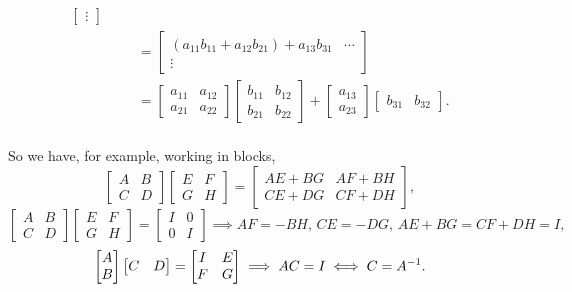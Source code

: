 \documentclass[MathsNotesBase.tex]{subfiles}
\begin{document}
{\begin{align*}
\begin{bmatrix}
			\vdots
			\end{bmatrix} \\
		&&  &= 
			\begin{bmatrix}
			(a_{11}b_{11} + a_{12}b_{21}) + a_{13}b_{31} & \cdots\\
			\vdots
			\end{bmatrix} \\
		&&  &= 
			\begin{bmatrix}
			a_{11} & a_{12}\\
			a_{21} & a_{22}
			\end{bmatrix} 
			\begin{bmatrix}
			b_{11} & b_{12}\\
			b_{21} & b_{22}
			\end{bmatrix} + 
			\begin{bmatrix}
			a_{13}\\a_{23}
			\end{bmatrix}
			\begin{bmatrix}
			b_{31} & b_{32}
			\end{bmatrix}.\\
		\end{align*}
		
		So we have, for example, working in blocks,
		\[
			\begin{bmatrix}
			A & B\\
			C & D
			\end{bmatrix}
			\begin{bmatrix}
			E & F\\
			G & H
			\end{bmatrix} = 
			\begin{bmatrix}
			AE + BG & AF + BH\\
			CE + DG & CF + DH
			\end{bmatrix},
		\]
		\[
			\begin{bmatrix}
			A & B\\
			C & D
			\end{bmatrix}
			\begin{bmatrix}
			E & F\\
			G & H
			\end{bmatrix} = 
			\begin{bmatrix}
			I & 0\\
			0 & I
			\end{bmatrix} \implies
			AF = -BH,\, CE = -DG,\, AE + BG = CF + DH = I,
		\]
		\[ 
			\begin{bmatrix}
			A\\B
			\end{bmatrix}
			\begin{bmatrix}
			C & D
			\end{bmatrix} =
			\begin{bmatrix}
			I & E\\
			F & G
			\end{bmatrix} \implies
			AC = I \iff C = {A}^{-1}.
		\]
		
}
\end{document}

